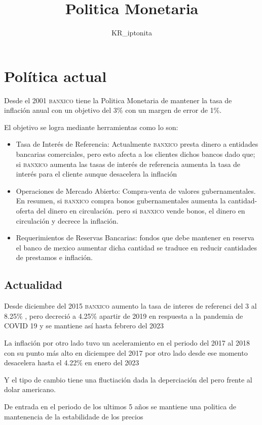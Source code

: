 \documentclass{article}
\title{Politica Monetaria}
\author{KR\_iptonita}
\theoremstyle{mytheoremstyle}
\theoremstyle{mytheoremstyle}
\theoremstyle{myproblemstyle}
\begin{document}
    \maketitle
\section{Política actual}
Desde el 2001 \textsc{banxico} tiene la Politica Monetaria de mantener la tasa de inflación anual
con un objetivo del 3\% con un margen de error de 1\%.

El objetivo se logra mediante herramientas como lo son:

\begin{itemize}
    \item Tasa de Interés de Referencia: Actualmente \textsc{banxico}
    presta dinero a entidades bancarias comerciales, pero esto afecta a los clientes
    dichos bancos dado que; si \textsc{banxico} aumenta las tasas de interés de referencia
    aumenta la tasa de interés para el cliente aunque desacelera la inflación
    \item Operaciones de Mercado Abierto: Compra-venta de valores gubernamentales.
    En resumen, si \textsc{banxico} compra bonos gubernamentales aumenta la cantidad-oferta del dinero en circulación.
    pero si \textsc{banxico} vende bonos, el dinero en circulación y decrece la inflación.
    \item Requerimientos de Reservas Bancarias: fondos que debe mantener en reserva el banco de mexico
    aumentar dicha cantidad se traduce en reducir cantidades de prestamos e inflación. 

\end{itemize}

  \subsection{Actualidad}

    Desde diciembre del 2015  \textsc{banxico} aumento la tasa de interes de referenci del 3 al 8.25\% , pero decreció a 4.25\% apartir de 2019
    en respuesta a la pandemia de COVID 19 y se mantiene así hasta febrero del 2023

    La inflación por otro lado tuvo un aceleramiento en el periodo del 2017 al 2018 con su punto más alto en diciempre del 2017
    por otro lado desde ese momento desacelera hasta el 4.22\% en enero del 2023

    
    Y el tipo de cambio tiene una fluctiación dada la deperciación del pero frente al dolar americano.

    De entrada en el periodo de los ultimos 5 años se mantiene una politica de mantenencia de  la estabilidade de los precios
    
\end{document}
